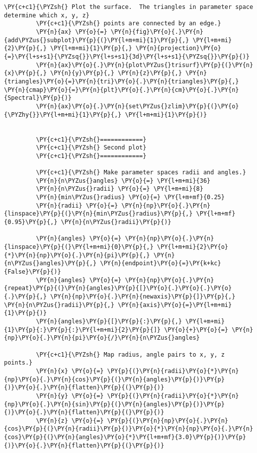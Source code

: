 \begin{Verbatim}[commandchars=\\\{\}]
         \PY{c+c1}{\PYZsh{} Plot the surface.  The triangles in parameter space determine which x, y, z}
         \PY{c+c1}{\PYZsh{} points are connected by an edge.}
         \PY{n}{ax} \PY{o}{=} \PY{n}{fig}\PY{o}{.}\PY{n}{add\PYZus{}subplot}\PY{p}{(}\PY{l+m+mi}{1}\PY{p}{,} \PY{l+m+mi}{2}\PY{p}{,} \PY{l+m+mi}{1}\PY{p}{,} \PY{n}{projection}\PY{o}{=}\PY{l+s+s1}{\PYZsq{}}\PY{l+s+s1}{3d}\PY{l+s+s1}{\PYZsq{}}\PY{p}{)}
         \PY{n}{ax}\PY{o}{.}\PY{n}{plot\PYZus{}trisurf}\PY{p}{(}\PY{n}{x}\PY{p}{,} \PY{n}{y}\PY{p}{,} \PY{n}{z}\PY{p}{,} \PY{n}{triangles}\PY{o}{=}\PY{n}{tri}\PY{o}{.}\PY{n}{triangles}\PY{p}{,} \PY{n}{cmap}\PY{o}{=}\PY{n}{plt}\PY{o}{.}\PY{n}{cm}\PY{o}{.}\PY{n}{Spectral}\PY{p}{)}
         \PY{n}{ax}\PY{o}{.}\PY{n}{set\PYZus{}zlim}\PY{p}{(}\PY{o}{\PYZhy{}}\PY{l+m+mi}{1}\PY{p}{,} \PY{l+m+mi}{1}\PY{p}{)}
         
         
         \PY{c+c1}{\PYZsh{}============}
         \PY{c+c1}{\PYZsh{} Second plot}
         \PY{c+c1}{\PYZsh{}============}
         
         \PY{c+c1}{\PYZsh{} Make parameter spaces radii and angles.}
         \PY{n}{n\PYZus{}angles} \PY{o}{=} \PY{l+m+mi}{36}
         \PY{n}{n\PYZus{}radii} \PY{o}{=} \PY{l+m+mi}{8}
         \PY{n}{min\PYZus{}radius} \PY{o}{=} \PY{l+m+mf}{0.25}
         \PY{n}{radii} \PY{o}{=} \PY{n}{np}\PY{o}{.}\PY{n}{linspace}\PY{p}{(}\PY{n}{min\PYZus{}radius}\PY{p}{,} \PY{l+m+mf}{0.95}\PY{p}{,} \PY{n}{n\PYZus{}radii}\PY{p}{)}
         
         \PY{n}{angles} \PY{o}{=} \PY{n}{np}\PY{o}{.}\PY{n}{linspace}\PY{p}{(}\PY{l+m+mi}{0}\PY{p}{,} \PY{l+m+mi}{2}\PY{o}{*}\PY{n}{np}\PY{o}{.}\PY{n}{pi}\PY{p}{,} \PY{n}{n\PYZus{}angles}\PY{p}{,} \PY{n}{endpoint}\PY{o}{=}\PY{k+kc}{False}\PY{p}{)}
         \PY{n}{angles} \PY{o}{=} \PY{n}{np}\PY{o}{.}\PY{n}{repeat}\PY{p}{(}\PY{n}{angles}\PY{p}{[}\PY{o}{.}\PY{o}{.}\PY{o}{.}\PY{p}{,} \PY{n}{np}\PY{o}{.}\PY{n}{newaxis}\PY{p}{]}\PY{p}{,} \PY{n}{n\PYZus{}radii}\PY{p}{,} \PY{n}{axis}\PY{o}{=}\PY{l+m+mi}{1}\PY{p}{)}
         \PY{n}{angles}\PY{p}{[}\PY{p}{:}\PY{p}{,} \PY{l+m+mi}{1}\PY{p}{:}\PY{p}{:}\PY{l+m+mi}{2}\PY{p}{]} \PY{o}{+}\PY{o}{=} \PY{n}{np}\PY{o}{.}\PY{n}{pi}\PY{o}{/}\PY{n}{n\PYZus{}angles}
         
         \PY{c+c1}{\PYZsh{} Map radius, angle pairs to x, y, z points.}
         \PY{n}{x} \PY{o}{=} \PY{p}{(}\PY{n}{radii}\PY{o}{*}\PY{n}{np}\PY{o}{.}\PY{n}{cos}\PY{p}{(}\PY{n}{angles}\PY{p}{)}\PY{p}{)}\PY{o}{.}\PY{n}{flatten}\PY{p}{(}\PY{p}{)}
         \PY{n}{y} \PY{o}{=} \PY{p}{(}\PY{n}{radii}\PY{o}{*}\PY{n}{np}\PY{o}{.}\PY{n}{sin}\PY{p}{(}\PY{n}{angles}\PY{p}{)}\PY{p}{)}\PY{o}{.}\PY{n}{flatten}\PY{p}{(}\PY{p}{)}
         \PY{n}{z} \PY{o}{=} \PY{p}{(}\PY{n}{np}\PY{o}{.}\PY{n}{cos}\PY{p}{(}\PY{n}{radii}\PY{p}{)}\PY{o}{*}\PY{n}{np}\PY{o}{.}\PY{n}{cos}\PY{p}{(}\PY{n}{angles}\PY{o}{*}\PY{l+m+mf}{3.0}\PY{p}{)}\PY{p}{)}\PY{o}{.}\PY{n}{flatten}\PY{p}{(}\PY{p}{)}
         

\end{Verbatim}
